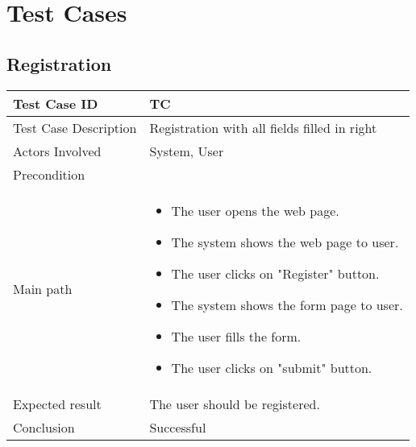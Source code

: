 \newpage
\section{Test Cases}
\subsection{Registration}


\begin{center} \begin{tabular}{|l|l|}
  \hline
  Test Case ID& TC \z\\
  \hline
  Test Case Description & Registration with all fields filled in right\\
  \hline
  Actors Involved & System, User\\
   \hline
  Precondition & \\
  \hline
  Main path &   \begin{minipage}{5in}
    \vskip 4pt
            \begin{itemize}
              \item The user opens the web page.
              \item The system shows the web page to user.
              \item The user clicks on "Register" button.
              \item The system shows the form page to user.
              \item The user fills the form.
              \item The user clicks on "submit" button.
            \end{itemize}
    \vskip 4pt
  \end{minipage}  \\
  \hline
  Expected result & The user should be registered.\\
  \hline
  Conclusion & Successful\\
  \hline
\end{tabular} \end{center}


